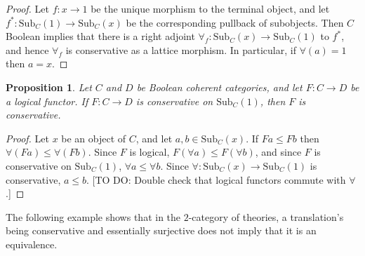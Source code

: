 \documentclass[12pt]{article}
\newtheorem{prop}{Proposition}
\theoremstyle{definition}
\theoremstyle{remark}
\newcommand{\3}{\mathcal}
\begin{document}
\begin{proof} Let $f:x\to 1$ be the unique morphism to the terminal
  object, and let $f^*:\mathrm{Sub}_C(1)\to \mathrm{Sub}_C(x)$ be the
  corresponding pullback of subobjects. Then $C$ Boolean implies that
  there is a right adjoint
  $\forall _f:\mathrm{Sub}_C(x)\to \mathrm{Sub}_C(1)$ to $f^*$, and
  hence $\forall _f$ is conservative as a lattice morphism. In
  particular, if $\forall (a)=1$ then $a=x$. \end{proof}

\begin{prop} Let $C$ and $D$ be Boolean coherent categories, and let
  $F:C\to D$ be a logical functor. If $F:C\to D$ is conservative on
  $\mathrm{Sub}_C(1)$, then $F$ is conservative. \end{prop}

\begin{proof} Let $x$ be an object of $C$, and let
  $a,b\in \mathrm{Sub}_C(x)$. If $Fa\leq Fb$ then
  $\forall (Fa)\leq \forall (Fb)$. Since $F$ is logical,
  $F(\forall a)\leq F(\forall b)$, and since $F$ is conservative on
  $\mathrm{Sub}_C(1)$, $\forall a\leq \forall b$. Since
  $\forall :\mathrm{Sub}_C(x)\to \mathrm{Sub}_C(1)$ is conservative,
  $a\leq b$. [TO DO: Double check that logical functors commute with
  $\forall$.]
  \end{proof}


The following example shows that in the $2$-category of theories, a
translation's being conservative and essentially surjective does not
imply that it is an equivalence.
\end{document}
